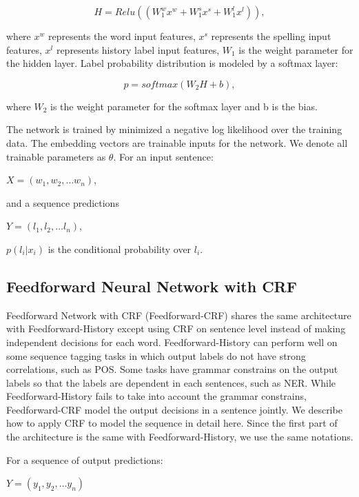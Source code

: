 \documentclass{sfuthesis}
\begin{document}
\begin{equation}
H=Relu\left(\left( W_{1}^{w}x^{w}+W_{1}^{s}x^{s}+W_{1}^{l}x^{l}\right)\right),
\end{equation}

where $x^{w}$ represents the word input features, $x^{s}$ represents the spelling input features, $x^{l}$ represents history label input features, $W_{1}$ is the weight parameter for the hidden layer. Label probability distribution is modeled by a softmax layer:

\begin{equation}
p=softmax\left(W_{2}H+b\right),
\end{equation}

where $W_{2}$ is the weight parameter for the softmax layer and b is the bias.

The network is trained by minimized a negative log likelihood over the training data. The embedding vectors are trainable inputs for the network. We denote all trainable parameters as $\theta$.
For an input sentence:

$X=\left( w_{1},w_{2},\ldots w_{n}\right)$, 

and a sequence predictions


$Y=\left( l_{1},l_{2},\ldots l_{n}\right)$,

$p\left( l_{i}|x_{i}\right)$ is the conditional probability over $l_{i}$.

\subsection{Feedforward Neural Network with CRF}
\label{Feedforward-CRF}
Feedforward Network with CRF (Feedforward-CRF) shares the same architecture with Feedforward-History except using CRF on sentence level instead of making independent decisions for each word. Feedforward-History can perform well on some sequence tagging tasks in which output labels do not have strong correlations, such as POS. Some tasks have grammar constrains on the output labels so that the labels are dependent in each sentences, such as NER. While Feedforward-History fails to take into account the grammar constrains, Feedforward-CRF model the output decisions in a sentence jointly. We describe how to apply CRF to model the sequence in detail here. Since the first part of the architecture is the same with Feedforward-History, we use the same notations.

For a sequence of output predictions:

$Y=\left( y_{1},y_{2},\ldots y_{n}\right)$
\end{document}
